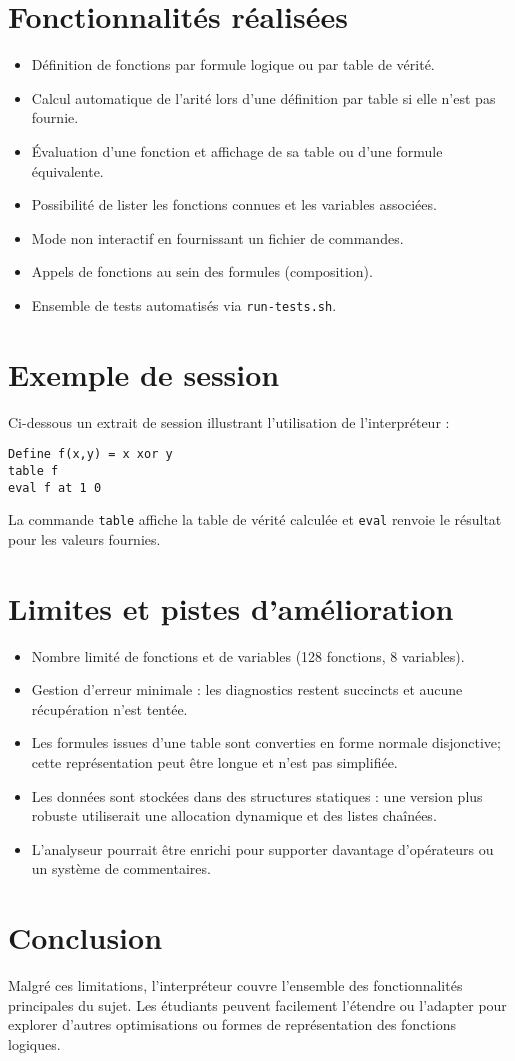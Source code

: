 \documentclass[11pt,a4paper]{article}
\begin{document}
\section*{Fonctionnalités réalisées}
\begin{itemize}
  \item Définition de fonctions par formule logique ou par table de vérité.
  \item Calcul automatique de l'arité lors d'une définition par table si elle n'est pas fournie.
  \item Évaluation d'une fonction et affichage de sa table ou d'une formule équivalente.
  \item Possibilité de lister les fonctions connues et les variables associées.
  \item Mode non interactif en fournissant un fichier de commandes.
  \item Appels de fonctions au sein des formules (composition).
  \item Ensemble de tests automatisés via \texttt{run-tests.sh}.
\end{itemize}

\section*{Exemple de session}
Ci-dessous un extrait de session illustrant l'utilisation de l'interpr\'eteur :
\begin{verbatim}
Define f(x,y) = x xor y
table f
eval f at 1 0
\end{verbatim}
La commande \texttt{table} affiche la table de v\'erit\'e calcul\'ee et \texttt{eval} renvoie le r\'esultat pour les valeurs fournies.
\section*{Limites et pistes d'amélioration}
\begin{itemize}
  \item Nombre limité de fonctions et de variables (128 fonctions, 8 variables).
  \item Gestion d'erreur minimale : les diagnostics restent succincts et aucune récupération n'est tentée.
  \item Les formules issues d'une table sont converties en forme normale disjonctive; cette représentation peut être longue et n'est pas simplifiée.
  \item Les données sont stockées dans des structures statiques : une version plus robuste utiliserait une allocation dynamique et des listes chaînées.
  \item L'analyseur pourrait être enrichi pour supporter davantage d'opérateurs ou un système de commentaires.
\end{itemize}
\section*{Conclusion}
Malgré ces limitations, l'interpréteur couvre l'ensemble des fonctionnalités principales du sujet. Les étudiants peuvent facilement l'étendre ou l'adapter pour explorer d'autres optimisations ou formes de représentation des fonctions logiques.
\end{document}
